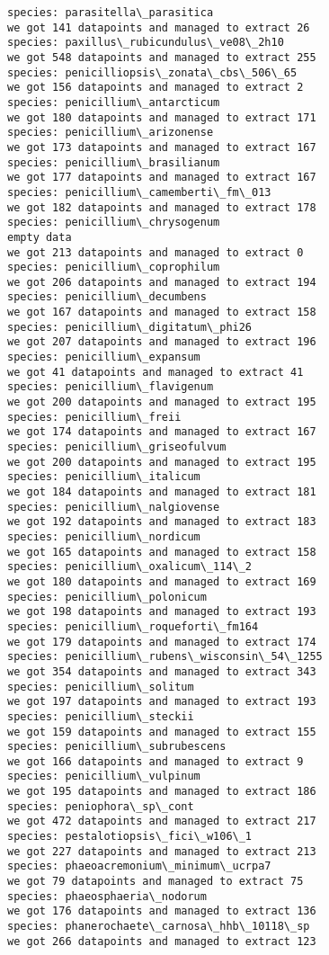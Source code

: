 \documentclass[11pt]{article}
\begin{document}
\begin{Verbatim}[commandchars=\\\{\}]
species: parasitella\_parasitica
we got 141 datapoints and managed to extract 26
species: paxillus\_rubicundulus\_ve08\_2h10
we got 548 datapoints and managed to extract 255
species: penicilliopsis\_zonata\_cbs\_506\_65
we got 156 datapoints and managed to extract 2
species: penicillium\_antarcticum
we got 180 datapoints and managed to extract 171
species: penicillium\_arizonense
we got 173 datapoints and managed to extract 167
species: penicillium\_brasilianum
we got 177 datapoints and managed to extract 167
species: penicillium\_camemberti\_fm\_013
we got 182 datapoints and managed to extract 178
species: penicillium\_chrysogenum
empty data
we got 213 datapoints and managed to extract 0
species: penicillium\_coprophilum
we got 206 datapoints and managed to extract 194
species: penicillium\_decumbens
we got 167 datapoints and managed to extract 158
species: penicillium\_digitatum\_phi26
we got 207 datapoints and managed to extract 196
species: penicillium\_expansum
we got 41 datapoints and managed to extract 41
species: penicillium\_flavigenum
we got 200 datapoints and managed to extract 195
species: penicillium\_freii
we got 174 datapoints and managed to extract 167
species: penicillium\_griseofulvum
we got 200 datapoints and managed to extract 195
species: penicillium\_italicum
we got 184 datapoints and managed to extract 181
species: penicillium\_nalgiovense
we got 192 datapoints and managed to extract 183
species: penicillium\_nordicum
we got 165 datapoints and managed to extract 158
species: penicillium\_oxalicum\_114\_2
we got 180 datapoints and managed to extract 169
species: penicillium\_polonicum
we got 198 datapoints and managed to extract 193
species: penicillium\_roqueforti\_fm164
we got 179 datapoints and managed to extract 174
species: penicillium\_rubens\_wisconsin\_54\_1255
we got 354 datapoints and managed to extract 343
species: penicillium\_solitum
we got 197 datapoints and managed to extract 193
species: penicillium\_steckii
we got 159 datapoints and managed to extract 155
species: penicillium\_subrubescens
we got 166 datapoints and managed to extract 9
species: penicillium\_vulpinum
we got 195 datapoints and managed to extract 186
species: peniophora\_sp\_cont
we got 472 datapoints and managed to extract 217
species: pestalotiopsis\_fici\_w106\_1
we got 227 datapoints and managed to extract 213
species: phaeoacremonium\_minimum\_ucrpa7
we got 79 datapoints and managed to extract 75
species: phaeosphaeria\_nodorum
we got 176 datapoints and managed to extract 136
species: phanerochaete\_carnosa\_hhb\_10118\_sp
we got 266 datapoints and managed to extract 123

\end{Verbatim}
\end{document}
